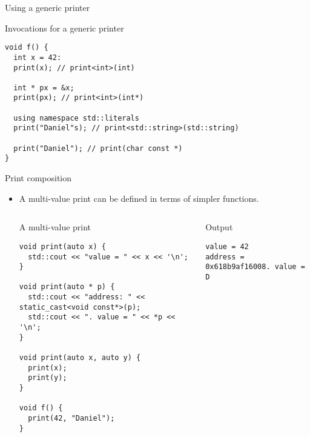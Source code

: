 \begin{frame}[t,fragile]{Using a generic printer}
\begin{block}{Invocations for a generic printer}
\begin{lstlisting}
void f() {
  int x = 42:
  print(x); // print<int>(int)

  int * px = &x;
  print(px); // print<int>(int*)

  using namespace std::literals
  print("Daniel"s); // print<std::string>(std::string)

  print("Daniel"); // print(char const *)
}
\end{lstlisting}
\end{block}
\end{frame}

\begin{frame}[t,fragile,shrink=15]{Print composition}
\begin{itemize}
  \item A multi-value print can be defined in terms of simpler functions.

\begin{columns}[T]

\begin{block}{A multi-value print}
\begin{lstlisting}
void print(auto x) {
  std::cout << "value = " << x << '\n';
}

void print(auto * p) {
  std::cout << "address: " << static_cast<void const*>(p);
  std::cout << ". value = " << *p << '\n';
}

void print(auto x, auto y) {
  print(x);
  print(y);
}

void f() {
  print(42, "Daniel");
}
\end{lstlisting}
\end{block}


\begin{block}{Output}
\begin{lstlisting}[style=terminal]
value = 42
address = 0x618b9af16008. value = D
\end{lstlisting}
\end{block}

\end{columns}

\end{itemize}
\end{frame}

